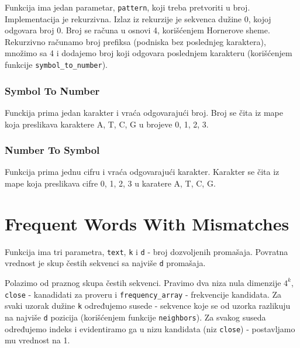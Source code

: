 Funkcija ima jedan parametar, \texttt{pattern}, koji treba pretvoriti u broj. Implementacija je rekurzivna. Izlaz iz rekurzije je sekvenca dužine 0, kojoj odgovara broj 0. Broj se računa u osnovi 4, korišćenjem Hornerove sheme. Rekurzivno računamo broj prefiksa (podniska bez poslednjeg karaktera), množimo sa 4 i dodajemo broj koji odgovara poslednjem karakteru (korišćenjem funkcije \texttt{symbol\_to\_number}).





\subsubsection{Symbol To Number}
\label{simbolToNumber}

Funckija prima jedan karakter i vraća odgovarajući broj. Broj se čita iz mape koja preslikava karaktere A, T, C, G u brojeve 0, 1, 2, 3.



\subsubsection{Number To Symbol}
\label{numberToSymbol}
Funkcija prima jednu cifru i vraća odgovarajući karakter. Karakter se čita iz mape koja preslikava cifre 0, 1, 2, 3 u karatere A, T, C, G.



\section{Frequent Words With Mismatches}

Funkcija ima tri parametra, \texttt{text}, \texttt{k} i \texttt{d} - broj dozvoljenih promašaja. Povratna vrednost je skup čestih sekvenci sa najviše \texttt{d} promašaja.

Polazimo od praznog skupa čestih sekvenci. Pravimo dva niza nula dimenzije $4^k$, \texttt{close} - kanadidati za proveru i \texttt{frequency\_array} - frekvencije kandidata. 
Za svaki uzorak dužine \texttt{k} određujemo susede - sekvence koje se od uzorka razlikuju na najviše \texttt{d} pozicija (korišćenjem funkcije \texttt{neighbors}). Za svakog suseda određujemo indeks i evidentiramo ga u nizu kandidata (niz \texttt{close}) - postavljamo mu vrednost na 1.

